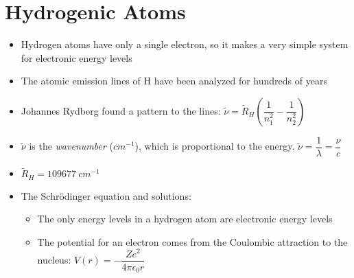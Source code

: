 \documentclass[12pt, openany, letterpaper]{memoir}
\begin{document}
\section{Hydrogenic Atoms}
\begin{itemize}
	\item Hydrogen atoms have only a single electron, so it makes a very simple system for electronic energy levels
	\item The atomic emission lines of H have been analyzed for hundreds of years
	\item Johannes Rydberg found a pattern to the lines: $\tilde{\nu}=\tilde{R}_H\left(\dfrac{1}{n_1^2}-\dfrac{1}{n_2^2}\right)$
	\item $\tilde{\nu}$ is the \emph{wavenumber} ($cm^{-1}$), which is proportional to the energy. $\tilde{\nu}=\dfrac{1}{\lambda}=\dfrac{\nu}{c}$
	\item $\tilde{R}_H=109677~cm^{-1}$
	\item The Schr\"odinger equation and solutions:
	\begin{itemize}
		\item The only energy levels in a hydrogen atom are electronic energy levels
		\item The potential for an electron comes from the Coulombic attraction to the nucleus: $V(r)=-\dfrac{Ze^2}{4\pi\epsilon_0r}$
		

\end{itemize}
\end{itemize}
\end{document}

